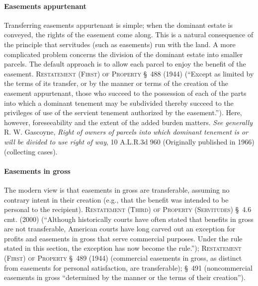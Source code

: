 \paragraph{Easements appurtenant}
Transferring easements appurtenant is simple; when the dominant estate is
conveyed, the rights of the easement come along. This is a natural consequence
of the principle that servitudes (such as easements) run with the land. A more
complicated problem concerns the division of the dominant estate into smaller
parcels. The default approach is to allow each parcel to enjoy the benefit of
the easement. \textsc{Restatement (First) of Property} \S~488 (1944) (``Except
as limited
by the terms of its transfer, or by the manner or terms of the creation of the
easement appurtenant, those who succeed to the possession of each of the parts
into which a dominant tenement may be subdivided thereby succeed to the
privileges of use of the servient tenement authorized by the easement.''). Here,
however, foreseeability and the extent of the added burden matters. \textit{See
generally} R. W. Gascoyne, \textit{Right of owners of parcels into which
dominant tenement is or will be divided to use right of way},  10 A.L.R.3d 960
(Originally published in 1966) (collecting cases).

\paragraph{Easements in gross}
The modern view is that easements in gross are transferable, assuming no
contrary intent in their creation (e.g., that the benefit was intended to be
personal to the recipient). \textsc{Restatement (Third) of Property
(Servitudes)} \S~4.6 cmt. (2000) (``Although historically courts have often
stated that benefits in gross are not transferable, American courts have long
carved out an exception for profits and easements in gross that serve commercial
purposes. Under the rule stated in this section, the exception has now become
the rule.''); \textsc{Restatement (First) of Property} \S~489 (1944) (commercial
easements in gross, as distinct from easements for personal satisfaction, are
transferable); \S~491 (noncommercial easements in gross ``determined by the
manner or the terms of their creation''). 

